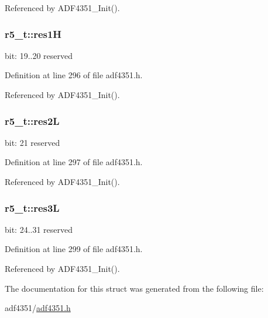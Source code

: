 Referenced by A\+D\+F4351\+\_\+\+Init().

\subsubsection[{\texorpdfstring{res1H}{res1H}}]{ r5\+\_\+t\+::res1H}\hypertarget{structr5__t_ac2077b2cbd35a25d80a3b485aeeeca16}{}\label{structr5__t_ac2077b2cbd35a25d80a3b485aeeeca16}
bit\+: 19..20 reserved 

Definition at line 296 of file adf4351.\+h.



Referenced by A\+D\+F4351\+\_\+\+Init().

\subsubsection[{\texorpdfstring{res2L}{res2L}}]{ r5\+\_\+t\+::res2L}\hypertarget{structr5__t_ad6a330a8f3ac938062893adae1547ad2}{}\label{structr5__t_ad6a330a8f3ac938062893adae1547ad2}
bit\+: 21 reserved 

Definition at line 297 of file adf4351.\+h.



Referenced by A\+D\+F4351\+\_\+\+Init().

\subsubsection[{\texorpdfstring{res3L}{res3L}}]{ r5\+\_\+t\+::res3L}\hypertarget{structr5__t_a4b3d74a8e15b3a85981a8cc7fe4c26b4}{}\label{structr5__t_a4b3d74a8e15b3a85981a8cc7fe4c26b4}
bit\+: 24..31 reserved 

Definition at line 299 of file adf4351.\+h.



Referenced by A\+D\+F4351\+\_\+\+Init().



The documentation for this struct was generated from the following file\+:\begin{DoxyCompactItemize}
\item 
adf4351/\hyperlink{adf4351_8h}{adf4351.\+h}\end{DoxyCompactItemize}
